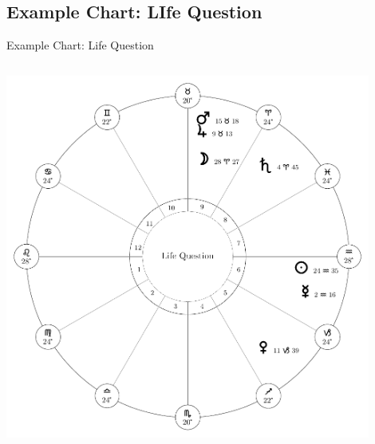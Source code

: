 \subsection{Example Chart: LIfe Question}
\begin{frame}[t]{Example Chart: Life Question}
\begin{columns}[T, onlytextwidth]

\begin{center}
{\includegraphics[width=0.9\textwidth]{charts/22-chart-life}}
\end{center}
\end{columns}
\end{frame}